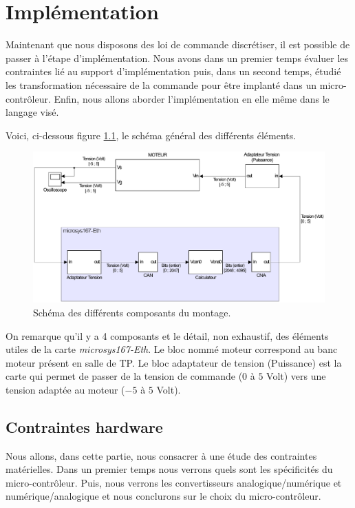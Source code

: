 \chapter{Implémentation}
\label{chap:implem}
Maintenant que nous disposons des loi de commande discrétiser, il est possible de passer à l'étape d'implémentation. Nous avons dans un premier temps évaluer les contraintes lié au support d'implémentation puis, dans un second temps, étudié les transformation nécessaire de la commande pour être implanté dans un micro-contrôleur. Enfin, nous allons aborder l'implémentation en elle même dans le langage visé.


Voici, ci-dessous figure \ref{fig:GeneralSCHEMA}, le schéma général des différents éléments.	
\begin{figure}[!ht]
\centering 
\includegraphics[width=.7\textwidth]{./V/images/schemaMO_MICRO.pdf}
\caption{\label{fig:GeneralSCHEMA}Schéma des différents composants du montage.}
\end{figure}
On remarque qu'il y a 4 composants et le détail, non exhaustif, des éléments utiles de la carte \emph{microsys167-Eth}.
Le bloc nommé moteur correspond au banc moteur présent en salle de TP. Le bloc adaptateur de tension (Puissance) est la carte qui permet de passer de la tension de commande ($0$ à $5$ Volt) vers une tension adaptée au moteur ($-5$ à $5$ Volt).
\section{Contraintes hardware} 
Nous allons, dans cette partie, nous consacrer à une étude des contraintes matérielles. Dans un premier temps nous verrons quels sont les spécificités du micro-contrôleur. Puis, nous verrons les convertisseurs analogique/numérique et numérique/analogique et nous conclurons sur le choix du micro-contrôleur. 
